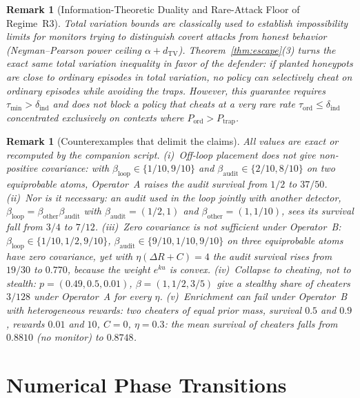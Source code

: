 \documentclass[11pt,a4paper]{article}
\newtheorem{remark}[theorem]{Remark}
\newcommand{\dTV}{d_{\mathrm{TV}}}
\begin{document}
\begin{remark}[Information-Theoretic Duality and Rare-Attack Floor of Regime~R3]
Total variation bounds are classically used to establish impossibility limits for \emph{monitors} trying to distinguish covert attacks from honest behavior (Neyman--Pearson power ceiling $\alpha + \dTV$). Theorem~\ref{thm:escape}(3) turns the exact same total variation inequality in favor of the \emph{defender}: if planted honeypots are close to ordinary episodes in total variation, no policy can selectively cheat on ordinary episodes while avoiding the traps. However, this guarantee requires $\tau_{\min} > \delta_{\mathrm{ind}}$ and does not block a policy that cheats at a very rare rate $\tau_{\mathrm{ord}} \le \delta_{\mathrm{ind}}$ concentrated exclusively on contexts where $P_{\mathrm{ord}} > P_{\mathrm{trap}}$.
\end{remark}

\begin{remark}[Counterexamples that delimit the claims]\label{rem:delimit}
All values are exact or recomputed by the companion script. (i)~\emph{Off-loop placement does not give non-positive covariance:} with $\beta_{\mathrm{loop}} \in \{1/10, 9/10\}$ and $\beta_{\mathrm{audit}} \in \{2/10, 8/10\}$ on two equiprobable atoms, Operator~A raises the audit survival from $1/2$ to $37/50$. (ii)~\emph{Nor is it necessary:} an audit used in the loop jointly with another detector, $\beta_{\mathrm{loop}} = \beta_{\mathrm{other}}\beta_{\mathrm{audit}}$ with $\beta_{\mathrm{audit}} = (1/2, 1)$ and $\beta_{\mathrm{other}} = (1, 1/10)$, sees its survival fall from $3/4$ to $7/12$. (iii)~\emph{Zero covariance is not sufficient under Operator~B:} $\beta_{\mathrm{loop}} \in \{1/10, 1/2, 9/10\}$, $\beta_{\mathrm{audit}} \in \{9/10, 1/10, 9/10\}$ on three equiprobable atoms have zero covariance, yet with $\eta(\Delta R + C) = 4$ the audit survival rises from $19/30$ to $0.770$, because the weight $e^{ku}$ is convex. (iv)~\emph{Collapse to cheating, not to stealth:} $p = (0.49, 0.5, 0.01)$, $\beta = (1, 1/2, 3/5)$ give a stealthy share of cheaters $3/128$ under Operator~A for every $\eta$. (v)~\emph{Enrichment can fail under Operator~B with heterogeneous rewards:} two cheaters of equal prior mass, survival $0.5$ and $0.9$, rewards $0.01$ and $10$, $C = 0$, $\eta = 0.3$: the mean survival of cheaters falls from $0.8810$ (no monitor) to $0.8748$.
\end{remark}

\section{Numerical Phase Transitions}
\end{document}
